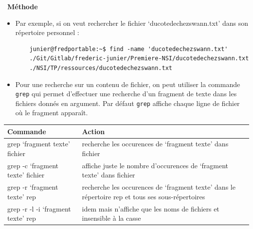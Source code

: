 \documentclass[
  11pt,
]{article}
\newenvironment{methode}[1]
{\par \medskip    \noindent  
 \begin {bclogo}[arrondi =0.1,logo=\bcoutil, marge=4,noborder = true] {~\textbf{Méthode}   {\itshape #1} }  \par}
{
\end{bclogo}
 \par \bigskip }
\begin{document}
\begin{methode}{}
\begin{itemize}
\item
  Par exemple, si on veut rechercher le fichier `ducotedechezswann.txt'
  dans son répertoire personnel :

\begin{verbatim}
    junier@fredportable:~$ find -name 'ducotedechezswann.txt' 
    ./Git/Gitlab/frederic-junier/Premiere-NSI/ducotedechezswann.txt
    ./NSI/TP/ressources/ducotedechezswann.txt
\end{verbatim}
\item
  Pour une recherche sur un contenu de fichier, on peut utiliser la
  commande \texttt{grep} qui permet d'effectuer une recherche d'un
  fragment de texte dans les fichiers donnés en argument. Par défaut
  \texttt{grep} affiche chaque ligne de fichier où le fragment apparaît.
\end{itemize}

\begin{longtable}[]{@{}ll@{}}
\toprule
\begin{minipage}[b]{0.25\columnwidth}\raggedright
Commande\strut
\end{minipage} & \begin{minipage}[b]{0.69\columnwidth}\raggedright
Action\strut
\end{minipage}\tabularnewline
\midrule
\endhead
\begin{minipage}[t]{0.25\columnwidth}\raggedright
grep `fragment texte' fichier\strut
\end{minipage} & \begin{minipage}[t]{0.69\columnwidth}\raggedright
recherche les occurences de `fragment texte' dans fichier\strut
\end{minipage}\tabularnewline
\begin{minipage}[t]{0.25\columnwidth}\raggedright
grep -c `fragment texte' fichier\strut
\end{minipage} & \begin{minipage}[t]{0.69\columnwidth}\raggedright
affiche juste le nombre d'occurences de `fragment texte' dans
fichier\strut
\end{minipage}\tabularnewline
\begin{minipage}[t]{0.25\columnwidth}\raggedright
grep -r `fragment texte' rep\strut
\end{minipage} & \begin{minipage}[t]{0.69\columnwidth}\raggedright
recherche les occurences de `fragment texte' dans le répertoire rep et
tous ses sous-répertoires\strut
\end{minipage}\tabularnewline
\begin{minipage}[t]{0.25\columnwidth}\raggedright
grep -r -l -i `fragment texte' rep\strut
\end{minipage} & \begin{minipage}[t]{0.69\columnwidth}\raggedright
idem mais n'affiche que les noms de fichiers et insensible à la
casse\strut
\end{minipage}\tabularnewline
\bottomrule
\end{longtable}


\end{methode}
\end{document}
